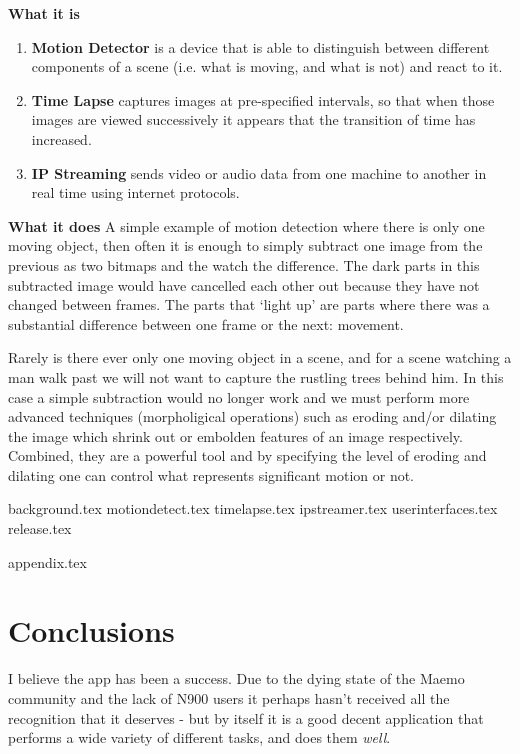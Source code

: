 \documentclass[11pt]{article} %
\begin{document}
{\large\bf What it is}
\begin{enumerate}
\item {\bf Motion Detector} is a device that is able to distinguish between different components of a scene (i.e. what is moving, and what is not) and react to it.
\item {\bf Time Lapse} captures images at pre-specified intervals, so that when those images are viewed successively it appears that the transition of time has increased.
\item {\bf IP Streaming} sends video or audio data from one machine to another in real time using internet protocols.
\end{enumerate}

{\large\bf What it does}
A simple example of motion detection where there is only one moving object, then often it is enough to simply subtract one image from the previous as two bitmaps and the watch the difference. The dark parts in this subtracted image would have cancelled each other out because they have not changed between frames. The parts that  ‘light up’ are parts where there was a substantial difference between one frame or the next: movement.

Rarely is there ever only one moving object in a scene, and for a scene watching a man walk past we will not want to capture the rustling trees behind him. In this case a simple subtraction would no longer work and we must perform more advanced techniques (morpholigical operations) such as eroding and/or dilating the image which shrink out or embolden features of an image respectively. Combined, they are a powerful tool and by specifying the level of eroding and dilating one can control what represents significant motion or not.




{background.tex}
{motiondetect.tex}
{timelapse.tex}
{ipstreamer.tex}
{userinterfaces.tex}
{release.tex}

{appendix.tex}

\part{Conclusions}
I believe the app has been a success. Due to the dying state of the Maemo community and the lack of N900 users it perhaps hasn’t received all the recognition that it deserves - but by itself it is a good decent application that performs a wide variety of different tasks, and does them {\it well}.
\end{document}
